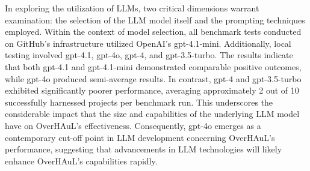 \documentclass[
  a4paper,
  DIV=11,
  numbers=noendperiod]{scrreprt}
\newenvironment{Shaded}{\begin{snugshade}}{\end{snugshade}}
\newcommand{\CommentTok}[1]{\textcolor[rgb]{0.41,0.41,0.41}{#1}}
\newcommand{\ControlFlowTok}[1]{\textcolor[rgb]{0.85,0.12,0.09}{#1}}
\newcommand{\DataTypeTok}[1]{\textcolor[rgb]{0.47,0.16,0.63}{#1}}
\newcommand{\DecValTok}[1]{\textcolor[rgb]{0.47,0.16,0.63}{#1}}
\newcommand{\KeywordTok}[1]{\textcolor[rgb]{0.85,0.12,0.09}{#1}}
\newcommand{\NormalTok}[1]{\textcolor[rgb]{0.33,0.33,0.33}{#1}}
\newcommand{\OperatorTok}[1]{\textcolor[rgb]{0.00,0.46,0.62}{#1}}
\theoremstyle{definition}
\theoremstyle{remark}
\begin{document}
%

In exploring the utilization of LLMs, two critical dimensions warrant
examination: the selection of the LLM model itself and the prompting
techniques employed. Within the context of model selection, all
benchmark tests conducted on GitHub's infrastructure utilized OpenAI's
gpt-4.1-mini. Additionally, local testing involved gpt-4.1, gpt-4o,
gpt-4, and gpt-3.5-turbo. The results indicate that both gpt-4.1 and
gpt-4.1-mini demonstrated comparable positive outcomes, while gpt-4o
produced semi-average results. In contrast, gpt-4 and gpt-3.5-turbo
exhibited significantly poorer performance, averaging approximately 2
out of 10 successfully harnessed projects per benchmark run. This
underscores the considerable impact that the size and capabilities of
the underlying LLM model have on OverHAuL's effectiveness. Consequently,
gpt-4o emerges as a contemporary cut-off point in LLM development
concerning OverHAuL's performance, suggesting that advancements in LLM
technologies will likely enhance OverHAuL's capabilities rapidly.
\end{document}
